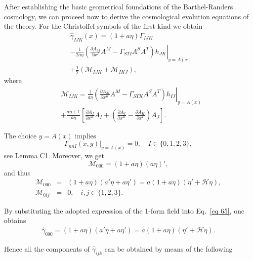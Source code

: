 \documentclass[aps,superscriptaddress, showpacs,preprintnumbers, superscriptaddress, nofootinbibt,twocolumn]{revtex4-2}
\def\bea{\begin{eqnarray}}
\def\eea{\end{eqnarray}}
\begin{document}
After establishing the basic geometrical foundations of the Barthel-Randers cosmology, we can proceed now to derive the cosmological evolution equations of the theory. For the Christoffel symbols of the first kind we obtain
\begin{equation}\label{eq 65}
\begin{split}
       & \hat{\gamma}_{IJK}(x)=(1+a\eta)\Gamma_{IJK}\\
       & -\left.\frac{1}{2a\eta}\left(
       \frac{\partial A_M}{\partial x^I}A^M-\Gamma_{STI}A^SA^T
       \right)h_{JK}\right|_{y=A(x)}\\
       &+\frac{1}{2}\left(\mathcal{M}_{IJK}+\mathcal{M}_{IKJ}\right),
\end{split}
\end{equation}
where
\begin{equation}
    \begin{split}
       & \mathcal{M}_{IJK}=\left. \frac{1}{a\eta}  \left(
       \frac{\partial A_M}{\partial x^K}A^M-\Gamma_{STK}A^SA^T
       \right)h_{IJ}\right|_{y=A(x)}\\
       &+\frac{a\eta+1}{a\eta}\left[
        \frac{\partial A_J}{\partial x^K}A_I+
        \left(\frac{\partial A_I}{\partial x^K}-
        \frac{\partial A_K}{\partial x^I}
        \right)A_J
        \right].
    \end{split}
\end{equation}


The choice $y=A(x)$ implies
\begin{equation}
    \Gamma_{nnI}(x,y)|_{y=A(x)}=0, \quad I\in \{0,1,2,3\},
\end{equation}
see Lemma C1. Moreover, we get
\begin{equation}
    \mathcal{M}_{000}= (1+a\eta)(a\eta)',
\end{equation}
and thus
\bea
    \mathcal{M}_{000}&=&(1+a\eta)(a'\eta+a\eta')= a(1+a\eta)(\eta '+\mathcal{H}\eta),\nonumber\\
    \mathcal{M}_{0ij}&=&0,\quad i,j\in\{1,2,3\}.
\eea

By substituting the adopted expression of the 1-form field into %
Eq.~\eqref{eq 65}, one obtains
\begin{align}
\hat\gamma_{000}=(1+a\eta)(a'\eta+a\eta')=
a(1+a\eta)(\eta '+\mathcal{H}\eta).
\end{align}

Hence all the components of $\hat{\gamma}_{ijk}$ can be obtained by means of the following
\smallskip
\end{document}
